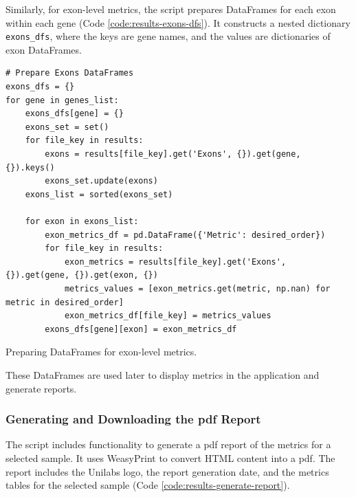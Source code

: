 Similarly, for exon-level metrics, the script prepares DataFrames for each exon within each gene (Code \ref{code:results-exons-dfs}). It constructs a nested dictionary \texttt{exons\_dfs}, where the keys are gene names, and the values are dictionaries of exon DataFrames.

\begin{longlisting}
\begin{verbatim}
# Prepare Exons DataFrames
exons_dfs = {}
for gene in genes_list:
    exons_dfs[gene] = {}
    exons_set = set()
    for file_key in results:
        exons = results[file_key].get('Exons', {}).get(gene, {}).keys()
        exons_set.update(exons)
    exons_list = sorted(exons_set)

    for exon in exons_list:
        exon_metrics_df = pd.DataFrame({'Metric': desired_order})
        for file_key in results:
            exon_metrics = results[file_key].get('Exons', {}).get(gene, {}).get(exon, {})
            metrics_values = [exon_metrics.get(metric, np.nan) for metric in desired_order]
            exon_metrics_df[file_key] = metrics_values
        exons_dfs[gene][exon] = exon_metrics_df
\end{verbatim}
\caption{Preparing DataFrames for exon-level metrics.}
\label{code:results-exons-dfs}
\end{longlisting}

These DataFrames are used later to display metrics in the application and generate reports.

\subsubsection{\textbf{Generating and Downloading the \ac{pdf} Report}}

The script includes functionality to generate a \ac{pdf} report of the metrics for a selected sample. It uses WeasyPrint to convert HTML content into a \ac{pdf}. The report includes the Unilabs logo, the report generation date, and the metrics tables for the selected sample (Code \ref{code:results-generate-report}).

